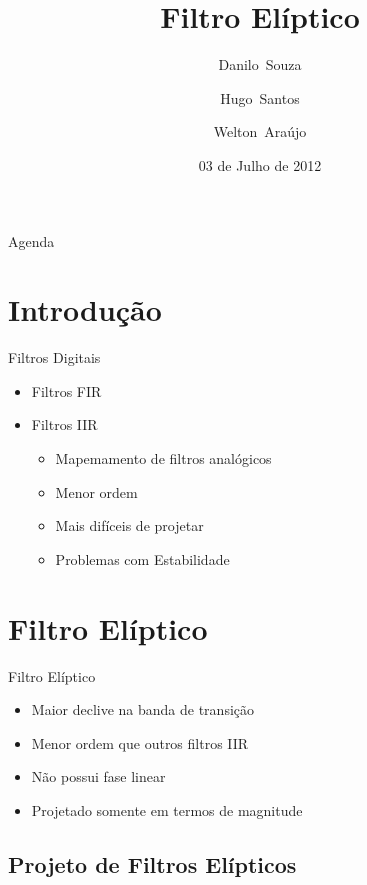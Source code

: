 \documentclass{beamer}
\title[Filtro El\'iptico]{%
Filtro El\'iptico%
}
\author[Souza,Santos,Ara\'ujo]{
     Danilo~Souza\and
     Hugo~Santos\and
     Welton~Ara\'ujo
     }
\institute[Bel\'em]{
  \inst{1}%
  Universidade Federal do Par\'a
  }
\date[Bel\'em 2012]{
  03 de Julho de 2012
  }
\begin{document}
\begin{frame}
  \titlepage
\end{frame}

\begin{frame}{Agenda}
  \tableofcontents
\end{frame}

\section{Introdu\c{c}\~ao}
\begin{frame}{Filtros Digitais}
	\begin{itemize}
	 \item	Filtros FIR
	 \item	Filtros IIR
		\begin{itemize}
		  \item Mapemamento de filtros anal\'ogicos
		  \item Menor ordem
		  \item Mais dif\'iceis de projetar
		  \item Problemas com Estabilidade
		\end{itemize}
	\end{itemize}
\end{frame}



\section{Filtro El\'iptico}

	
	\begin{frame}{Filtro El\'iptico}
		\begin{itemize}
			\item Maior declive na banda de transi\c{c}\~ao
			\item Menor ordem que outros filtros IIR
			\item N\~ao possui fase linear
			\item Projetado somente em termos de magnitude
		\end{itemize}
	\end{frame}




\subsection{Projeto de Filtros El\'ipticos}
   
\end{document}

